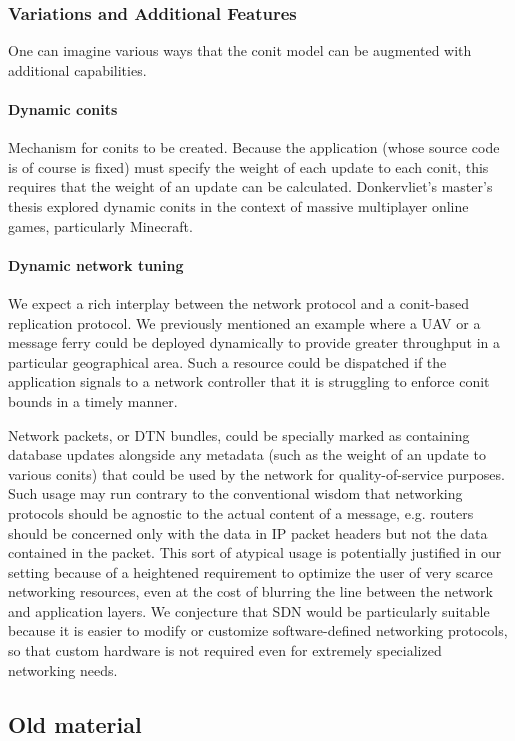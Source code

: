\documentclass[]             %
{NASA}                       %
\theoremstyle{definition}
\begin{document}
\subsubsection{Variations and Additional Features}
One can imagine various ways that the conit model can be augmented
with additional capabilities.

\paragraph{Dynamic conits}
Mechanism for conits to be created. Because the application (whose
source code is of course is fixed) must specify the weight of each
update to each conit, this requires that the weight of an update can
be calculated. Donkervliet's master's thesis \citationneeded explored
dynamic conits in the context of massive multiplayer online games,
particularly Minecraft.

\paragraph{Dynamic network tuning}
We expect a rich interplay between the network protocol and a
conit-based replication protocol. We previously mentioned an example
where a UAV or a message ferry could be deployed dynamically to
provide greater throughput in a particular geographical area. Such a
resource could be dispatched if the application signals to a network
controller that it is struggling to enforce conit bounds in a timely
manner.

Network packets, or DTN bundles, could be specially marked as
containing database updates alongside any metadata (such as the weight
of an update to various conits) that could be used by the network for
quality-of-service purposes. Such usage may run contrary to the
conventional wisdom that networking protocols should be agnostic to
the actual content of a message, e.g. routers should be concerned only
with the data in IP packet headers but not the data contained in the
packet. This sort of atypical usage is potentially justified in our
setting because of a heightened requirement to optimize the user of
very scarce networking resources, even at the cost of blurring the
line between the network and application layers. We conjecture that
SDN would be particularly suitable because it is easier to modify or
customize software-defined networking protocols, so that custom
hardware is not required even for extremely specialized networking
needs.

\subsection{Old material}
\end{document}
